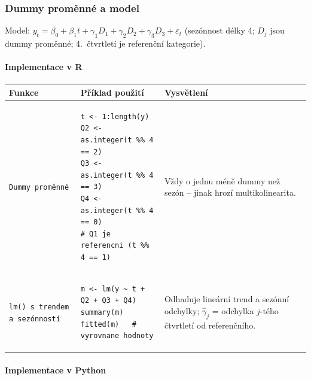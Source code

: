 \documentclass[a4paper, 11pt]{article}
\newenvironment{funkcedict}
{%
  \begingroup
  \renewcommand{\arraystretch}{1.4}%
  \lstset{basicstyle=\ttfamily\small, columns=fullflexible}%
  \setlength{\tabcolsep}{4pt}%
  \begin{tabular}{p{0.19\textwidth} p{0.38\textwidth} p{0.30\textwidth}}
  \textbf{Funkce} & \textbf{Příklad použití} & \textbf{Vysvětlení} \\
  \midrule
}
{%
  \end{tabular}%
  \endgroup
}
\begin{document}
\subsubsection{Dummy proměnné a model}

Model: $y_t = \beta_0 + \beta_1 t + \gamma_1 D_1 + \gamma_2 D_2 + \gamma_3 D_3 + \varepsilon_t$
(sezónnost délky 4; $D_j$ jsou dummy proměnné; 4.\ čtvrtletí je referenční kategorie).

\paragraph{Implementace v R}\mbox{}\par

\begin{funkcedict}

	\texttt{Dummy proměnné} &
	\begin{lstlisting}
t <- 1:length(y)
Q2 <- as.integer(t %% 4 == 2)
Q3 <- as.integer(t %% 4 == 3)
Q4 <- as.integer(t %% 4 == 0)
# Q1 je referencni (t %% 4 == 1)
	\end{lstlisting}
	&
	Vždy o jednu méně dummy než sezón -- jinak hrozí multikolinearita. \\

	\texttt{lm() s trendem a sezónností} &
	\begin{lstlisting}
m <- lm(y ~ t + Q2 + Q3 + Q4)
summary(m)
fitted(m)   # vyrovnane hodnoty
	\end{lstlisting}
	&
	Odhaduje lineární trend a sezónní odchylky; $\hat{\gamma}_j$ = odchylka $j$-tého čtvrtletí od referenčního. \\

\end{funkcedict}

\paragraph{Implementace v Python}\mbox{}\par
\end{document}
